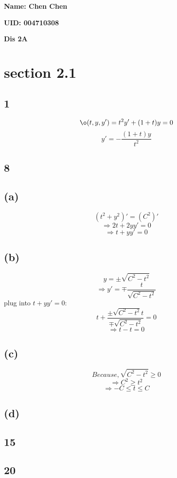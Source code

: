\documentclass[12pt, a4paper]{IEEEtran}
\begin{document}
    \centerline{\textbf{Name: Chen Chen}}
    \centerline{\textbf{UID: 004710308}}
    \centerline{\textbf{Dis 2A}}

    \section*{section 2.1}
    \subsection*{1}
    $$\o (t, y, y')=t^2y'+(1+t)y=0$$
    $$y'=-\frac{(1+t)y}{t^2}$$

    \subsection*{8}
    \subsection*{(a)}
    $$(t^2+y^2)'=(C^2)'$$
    $$\Rightarrow 2t+2yy'=0$$
    $$\Rightarrow t+yy'=0$$

    \subsection*{(b)}
    $$y=\pm \sqrt{C^2 -t^2}$$
    $$\Rightarrow y'=\mp \frac{t}{\sqrt{C^2-t^2}}$$
    plug into $t+yy'=0:$
    $$t+\frac{\pm \sqrt{C^2 -t^2}t}{\mp \sqrt{C^2-t^2}}=0$$
    $$\Rightarrow t-t=0$$

    \subsection*{(c)}
    $$Because , \sqrt{C^2-t^2}\geq 0$$
    $$\Rightarrow C^2 \geq t^2$$
    $$\Rightarrow -C\leq t \leq C$$

    \subsection*{(d)}
    \vspace{6cm}
    \subsection*{15}
    \vspace{6cm}
    \subsection*{20}
    \vspace{6cm}
\end{document}
